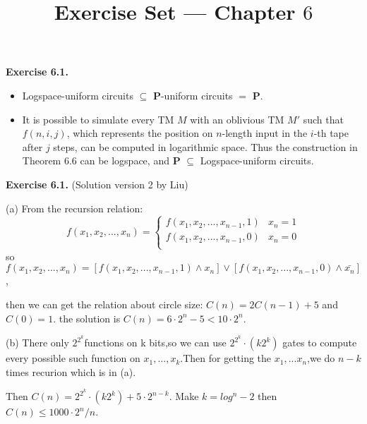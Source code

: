 \documentclass[a4paper]{article}
\title{Exercise Set --- Chapter $6$}
\date{}
\newenvironment{exercise}[1]{
	\par
	\noindent\textbf{Exercise #1.}\quad
}{
	\par
	\bigskip
}
\begin{document}
\maketitle



\begin{exercise}{6.1}
    \begin{itemize}
    \item Logspace-uniform circuits $\subseteq$ $\mathbf{P}$-uniform circuits $=$ $\mathbf{P}$.
    \item It is possible to simulate every TM $M$ with an oblivious TM $M'$ such that $f(n,i,j)$, which represents the position
        on $n$-length input in the $i$-th tape after $j$ steps, can be computed in logarithmic space.
            Thus the construction in Theorem 6.6 can be logspace, and $\mathbf{P}$ $\subseteq$ Logspace-uniform circuits.
    \end{itemize}
\end{exercise}

\begin{exercise}{6.1} \hspace{-1em}(Solution version 2 by Liu)

    (a) From the recursion relation:
        \begin{equation}
            f(x_1,x_2,...,x_n)=
            \begin{cases}
            f(x_1,x_2,...,x_{n-1},1) & \text{$x_n=1$}\\
            f(x_1,x_2,...,x_{n-1},0) & \text{$x_n=0$}\\
            \end{cases}
        \end{equation}
        so $f(x_1,x_2,...,x_n)=[f(x_1,x_2,...,x_{n-1},1)\wedge x_n]\vee [f(x_1,x_2,...,x_{n-1},0)\wedge \bar{x_n}]$,
        
        then we can get the relation about circle size:
         $C(n)= 2C(n-1)+5$ and $C(0)=1$.
         the solution is $C(n)=6\cdot2^{n}-5 < 10\cdot 2^{n}$.
         
    (b) There only $2^{2^{k}}$functions on k bits,so we can use $2^{2^{k}}\cdot (k 2^{k})$ gates to compute every possible  such function on $x_1,...,x_k$.Then for getting the $x_1,...x_n$,we do $n-k$ times recurion which is in (a).
    
        Then $C(n)=2^{2^{k}}\cdot (k2^{k}) + 5\cdot 2^{n-k}$.
        Make $k=log^n-2$ then $C(n)\leq 1000\cdot 2^n /n$.       
\end{exercise}
\end{document}
